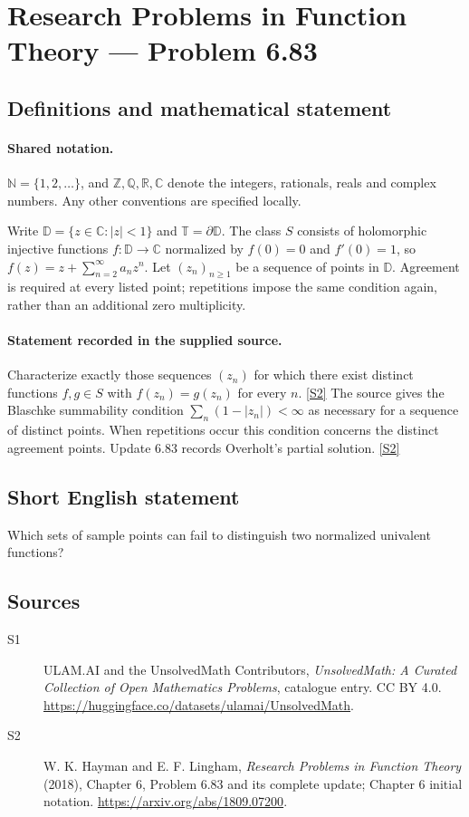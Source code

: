 \documentclass[11pt]{article}
\newcommand{\sref}[2]{\hyperlink{source:#1:#2}{[S#2]}}
\begin{document}
\section{Research Problems in Function Theory — Problem 6.83}\label{statement}

\subsection{Definitions and mathematical statement}

\paragraph{Shared notation.}$\mathbb N=\{1,2,\ldots\}$, and $\mathbb Z,\mathbb Q,\mathbb R,\mathbb C$ denote the integers, rationals, reals and complex numbers. Any other conventions are specified locally.


Write $\mathbb D=\{z\in\mathbb C:|z|<1\}$ and $\mathbb T=\partial\mathbb D$. The class $S$ consists of holomorphic injective functions $f:\mathbb D\to\mathbb C$ normalized by $f(0)=0$ and $f'(0)=1$, so $f(z)=z+\sum_{n=2}^{\infty}a_nz^n$. Let $(z_n)_{n\ge1}$ be a sequence of points in $\mathbb D$. Agreement is required at every listed point; repetitions impose the same condition again, rather than an additional zero multiplicity.
\paragraph{Statement recorded in the supplied source.}
Characterize exactly those sequences $(z_n)$ for which there exist distinct functions $f,g\in S$ with $f(z_n)=g(z_n)$ for every $n$. \sref{statement}{2}
The source gives the Blaschke summability condition $\sum_n(1-|z_n|)<\infty$ as necessary for a sequence of distinct points. When repetitions occur this condition concerns the distinct agreement points. Update 6.83 records Overholt's partial solution. \sref{statement}{2}
\subsection{Short English statement}
Which sets of sample points can fail to distinguish two normalized univalent functions?
\subsection{Sources}
\begin{description}
\item[\hypertarget{source:statement:1}{S1}] ULAM.AI and the UnsolvedMath Contributors, \emph{UnsolvedMath: A Curated Collection of Open Mathematics Problems}, catalogue entry. CC BY 4.0. \url{https://huggingface.co/datasets/ulamai/UnsolvedMath}.
\item[\hypertarget{source:statement:2}{S2}] W. K. Hayman and E. F. Lingham, \emph{Research Problems in Function Theory} (2018), Chapter 6, Problem 6.83 and its complete update; Chapter 6 initial notation. \url{https://arxiv.org/abs/1809.07200}.
\end{description}
\label{end:statement}
\end{document}
